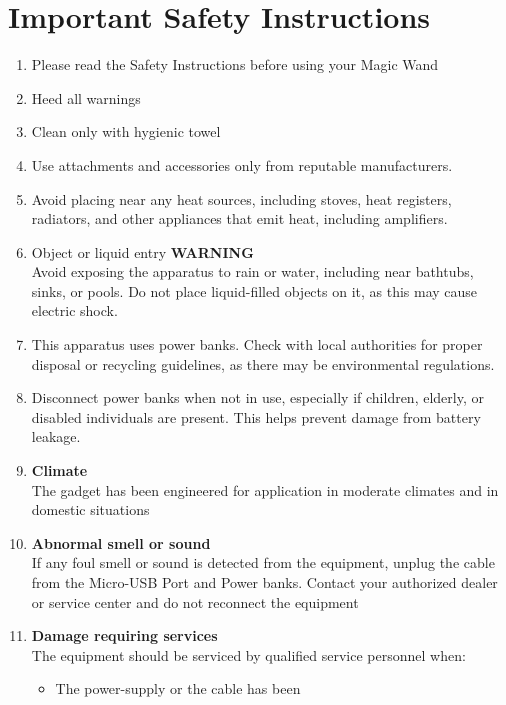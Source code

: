 %
%

\chapter{Important Safety Instructions}

\begin{enumerate}	
	\item Please read the Safety Instructions before using your Magic Wand
	\item Heed all warnings
	\item Clean only with hygienic towel
	\item Use attachments and accessories only from reputable manufacturers.
	\item Avoid placing near any heat sources, including stoves, heat registers, radiators, and other appliances that emit heat, including amplifiers.
	\item Object or liquid entry \textbf{WARNING}
	\\Avoid exposing the apparatus to rain or water, including near bathtubs, sinks, or pools. Do not place liquid-filled objects on it, as this may cause electric shock. 
	\item This apparatus uses power banks. Check with local authorities for proper disposal or recycling guidelines, as there may be environmental regulations.
	\item Disconnect power banks when not in use, especially if children, elderly, or disabled individuals are present. This helps prevent damage from battery leakage. 
	\item \textbf{Climate} 
	\\The gadget has been engineered for application in moderate climates and in domestic situations
	\item \textbf{Abnormal smell or sound} 
	\\If any foul smell or sound is detected from the equipment, unplug the cable from the Micro-USB Port and Power banks. Contact your authorized dealer or service center and do not reconnect the equipment
	\pagebreak
	\item \textbf{Damage requiring services} 
	\\The equipment should be serviced by qualified service personnel when:
	\begin{itemize}
		\item The power-supply or the cable has been

\end{itemize}
\end{enumerate}
